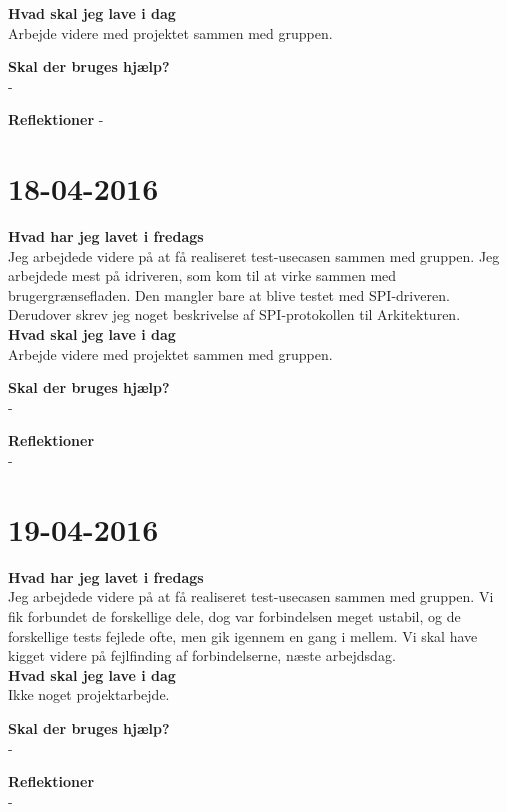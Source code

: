 \documentclass{article}
\begin{document}
	\textbf{Hvad skal jeg lave i dag}\\
	Arbejde videre med projektet sammen med gruppen. 
	
	\textbf{Skal der bruges hjælp?}\\
	-
	
	\textbf{Reflektioner}
	-
	
	
	
	\section{18-04-2016}
	
	\textbf{Hvad har jeg lavet i fredags}\\
	Jeg arbejdede videre på at få realiseret test-usecasen sammen med gruppen. Jeg arbejdede mest på idriveren, som kom til at virke sammen med brugergrænsefladen. Den mangler bare at blive testet med SPI-driveren.\\
	Derudover skrev jeg noget beskrivelse af SPI-protokollen til Arkitekturen.\\
	
	\textbf{Hvad skal jeg lave i dag}\\
	Arbejde videre med projektet sammen med gruppen. 
	
	\textbf{Skal der bruges hjælp?}\\
	-
	
	\textbf{Reflektioner}\\
	-
	
	
	
	\section{19-04-2016}
	
	\textbf{Hvad har jeg lavet i fredags}\\
	Jeg arbejdede videre på at få realiseret test-usecasen sammen med gruppen.
	Vi fik forbundet de forskellige dele, dog var forbindelsen meget ustabil, og de forskellige tests fejlede ofte, men gik igennem en gang i mellem. Vi skal have kigget videre på fejlfinding af forbindelserne, næste arbejdsdag. \\
	
	\textbf{Hvad skal jeg lave i dag}\\
	Ikke noget projektarbejde.
	
	\textbf{Skal der bruges hjælp?}\\
	-
	
	\textbf{Reflektioner}\\
	-
	
\end{document}
